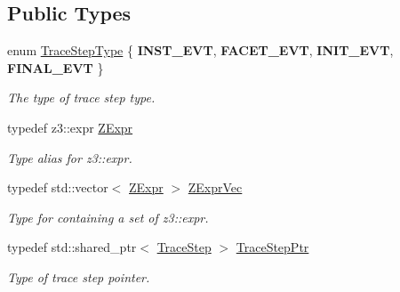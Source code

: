 \subsection*{Public Types}
\begin{DoxyCompactItemize}
\item 
\mbox{\label{classilang_1_1_trace_step_af2fb22e1a0aeacee818188a3e14c46dd}} 
enum \mbox{\hyperlink{classilang_1_1_trace_step_af2fb22e1a0aeacee818188a3e14c46dd}{Trace\+Step\+Type}} \{ {\bfseries I\+N\+S\+T\+\_\+\+E\+VT}, 
{\bfseries F\+A\+C\+E\+T\+\_\+\+E\+VT}, 
{\bfseries I\+N\+I\+T\+\_\+\+E\+VT}, 
{\bfseries F\+I\+N\+A\+L\+\_\+\+E\+VT}
 \}
\begin{DoxyCompactList}\small\item\em The type of trace step type. \end{DoxyCompactList}\item 
\mbox{\label{classilang_1_1_trace_step_a30c567f4df5a8481f8432b8c178a1794}} 
typedef z3\+::expr \mbox{\hyperlink{classilang_1_1_trace_step_a30c567f4df5a8481f8432b8c178a1794}{Z\+Expr}}
\begin{DoxyCompactList}\small\item\em Type alias for z3\+::expr. \end{DoxyCompactList}\item 
\mbox{\label{classilang_1_1_trace_step_a19a387426712dbec11dcecf170fb7e1a}} 
typedef std\+::vector$<$ \mbox{\hyperlink{classilang_1_1_trace_step_a30c567f4df5a8481f8432b8c178a1794}{Z\+Expr}} $>$ \mbox{\hyperlink{classilang_1_1_trace_step_a19a387426712dbec11dcecf170fb7e1a}{Z\+Expr\+Vec}}
\begin{DoxyCompactList}\small\item\em Type for containing a set of z3\+::expr. \end{DoxyCompactList}\item 
\mbox{\label{classilang_1_1_trace_step_a33d28af7bafbd3eadec8a957c63738ca}} 
typedef std\+::shared\+\_\+ptr$<$ \mbox{\hyperlink{classilang_1_1_trace_step}{Trace\+Step}} $>$ \mbox{\hyperlink{classilang_1_1_trace_step_a33d28af7bafbd3eadec8a957c63738ca}{Trace\+Step\+Ptr}}
\begin{DoxyCompactList}\small\item\em Type of trace step pointer. \end{DoxyCompactList}\item 

\end{DoxyCompactItemize}

